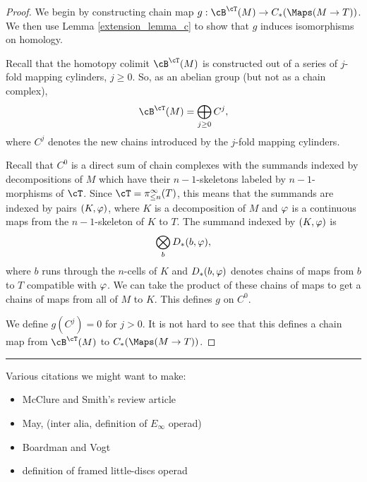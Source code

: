 
\begin{proof}
We begin by constructing chain map $g: \cB^\cT(M) \to C_*(\Maps(M\to T))$.
We then use Lemma \ref{extension_lemma_c} to show that $g$ induces isomorphisms on homology.

Recall that the homotopy colimit $\cB^\cT(M)$ is constructed out of a series of
$j$-fold mapping cylinders, $j \ge 0$.
So, as an abelian group (but not as a chain complex), 
\[
	\cB^\cT(M) = \bigoplus_{j\ge 0} C^j,
\]
where $C^j$ denotes the new chains introduced by the $j$-fold mapping cylinders.

Recall that $C^0$ is a direct sum of chain complexes with the summands indexed by
decompositions of $M$ which have their $n{-}1$-skeletons labeled by $n{-}1$-morphisms
of $\cT$.
Since $\cT = \pi^\infty_{\leq n}(T)$, this means that the summands are indexed by pairs
$(K, \varphi)$, where $K$ is a decomposition of $M$ and $\varphi$ is a continuous
maps from the $n{-}1$-skeleton of $K$ to $T$.
The summand indexed by $(K, \varphi)$ is
\[
	\bigotimes_b D_*(b, \varphi),
\]
where $b$ runs through the $n$-cells of $K$ and $D_*(b, \varphi)$ denotes
chains of maps from $b$ to $T$ compatible with $\varphi$.
We can take the product of these chains of maps to get a chains of maps from
all of $M$ to $K$.
This defines $g$ on $C^0$.

We define $g(C^j) = 0$ for $j > 0$.
It is not hard to see that this defines a chain map from 
$\cB^\cT(M)$ to $C_*(\Maps(M\to T))$.


\end{proof}


\medskip
\hrule
\medskip

\medskip
{}

\todo{}
Various citations we might want to make:
\begin{itemize}
\item \cite{MR2061854} McClure and Smith's review article
\item \cite{MR0420610} May, (inter alia, definition of $E_\infty$ operad)
\item \cite{MR0236922,MR0420609} Boardman and Vogt
\item \cite{MR1256989} definition of framed little-discs operad
\end{itemize}


